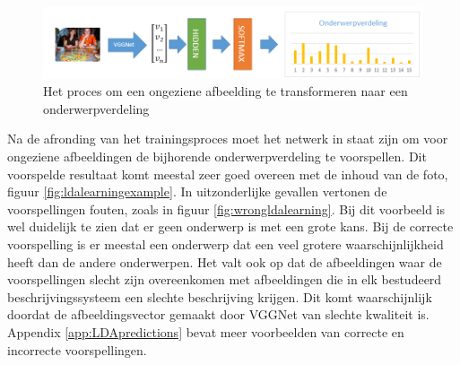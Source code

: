 \begin{figure}[tb]
    \centering
    \includegraphics[width=\linewidth]{Images/LDANetwerk.PNG}
    \caption{Het proces om een ongeziene afbeelding te transformeren naar een onderwerpverdeling}
    \label{fig:learningLDA}
\end{figure}

Na de afronding van het trainingsproces moet het netwerk in staat zijn om voor ongeziene afbeeldingen de bijhorende onderwerpverdeling te voorspellen. Dit voorspelde resultaat komt meestal zeer goed overeen met de inhoud van de foto, figuur \ref{fig:ldalearningexample}. In uitzonderlijke gevallen vertonen de voorspellingen fouten, zoals in figuur \ref{fig:wrongldalearning}. Bij dit voorbeeld is wel duidelijk te zien dat er geen onderwerp is met een grote kans. Bij de correcte voorspelling is er meestal een onderwerp dat een veel grotere waarschijnlijkheid heeft dan de andere onderwerpen. Het valt ook op dat de afbeeldingen waar de voorspellingen slecht zijn overeenkomen met afbeeldingen die in elk bestudeerd beschrijvingssysteem een slechte beschrijving krijgen. Dit komt waarschijnlijk doordat de afbeeldingsvector gemaakt door VGGNet van slechte kwaliteit is. Appendix \ref{app:LDApredictions} bevat meer voorbeelden van correcte en incorrecte voorspellingen.

